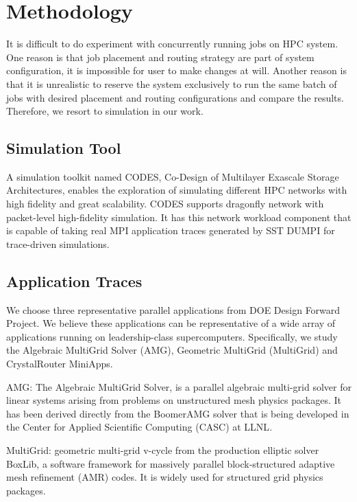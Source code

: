 \documentclass[conference,compsoc]{IEEEtran}
\begin{document}
\section{Methodology}
\label{sec: methodology}

It is difficult to do experiment with concurrently running jobs on HPC system. One reason is that job placement and routing strategy are part of system configuration, it is impossible for user to make changes at will. Another reason is that it is unrealistic to reserve the system exclusively to run the same batch of jobs with desired placement and routing configurations and compare the results. Therefore, we resort to simulation in our work.

\subsection{Simulation Tool}
A simulation toolkit named CODES, Co-Design of Multilayer Exascale Storage Architectures, enables the exploration of simulating different HPC networks with high fidelity and great scalability\cite{codes}.  CODES supports dragonfly network with packet-level high-fidelity simulation\cite{codes-dragonfly}. It has this network workload component that is capable of taking real MPI application traces generated by SST DUMPI\cite{sst} for trace-driven simulations.

\subsection{Application Traces}
\label{sec: application traces}

We choose three representative parallel applications from DOE Design Forward Project\cite{designforwardwebpage}. We believe these applications can be representative of a wide array of applications running on leadership-class supercomputers. Specifically, we study the Algebraic MultiGrid Solver (AMG), Geometric MultiGrid (MultiGrid) and CrystalRouter MiniApps. 

AMG: The Algebraic MultiGrid Solver, is a parallel algebraic multi-grid solver for linear systems arising from problems on unstructured mesh physics packages. It has been derived directly from the BoomerAMG solver that is being developed in the Center for Applied Scientific Computing (CASC) at LLNL\cite{amg}. 

MultiGrid:  geometric multi-grid v-cycle from the production elliptic solver BoxLib, a software framework for massively parallel block-structured adaptive mesh refinement (AMR) codes\cite{boxlib}. It is widely used for structured grid physics packages. 
\end{document}
